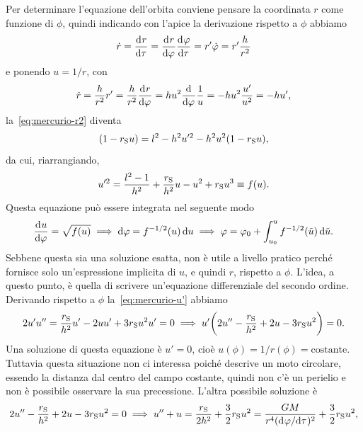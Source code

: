 Per determinare l'equazione dell'orbita conviene pensare la coordinata $r$ come
funzione di $\phi$, quindi indicando con l'apice la derivazione rispetto a
$\phi$ abbiamo
\begin{equation}
  \dot{r} = \frac{{\mathop{}\!\mathrm{d}^{}}r}{\mathop{}\!\mathrm{d} {\tau}^{}} = \frac{{\mathop{}\!\mathrm{d}^{}}r}{\mathop{}\!\mathrm{d} {\varphi}^{}} \frac{{\mathop{}\!\mathrm{d}^{}}\varphi}{\mathop{}\!\mathrm{d} {\tau}^{}} = r' \dot{\varphi}
  = r' \frac{h}{r^{2}}
\end{equation}
e ponendo $u = 1/r$, con
\begin{equation}
  \dot{r} = \frac{h}{r^{2}}r' = \frac{h}{r^{2}}\frac{{\mathop{}\!\mathrm{d}^{}}r}{\mathop{}\!\mathrm{d} {\varphi}^{}} =
  hu^{2}\frac{{\mathop{}\!\mathrm{d}^{}}}{\mathop{}\!\mathrm{d} {\varphi}^{}} \frac{1}{u} = -hu^{2}\frac{u'}{u^{2}} = -hu',
\end{equation}
la~\eqref{eq:mercurio-r2} diventa
\begin{equation}
  (1 - r_{\textup{S}}u) = l^{2} - h^{2}u'^{2} - h^{2}u^{2}(1 - r_{\textup{S}}u),
\end{equation}
da cui, riarrangiando,
\begin{equation}
  \label{eq:mercurio-u'}
  u'^{2} = \frac{l^{2} - 1}{h^{2}} + \frac{r_{\textup{S}}}{h^{2}}u - u^{2} +
  r_{\textup{S}}u^{3} \equiv f(u).
\end{equation}
Questa equazione può essere integrata nel seguente modo
\begin{equation}
  \frac{{\mathop{}\!\mathrm{d}^{}}u}{\mathop{}\!\mathrm{d} {\varphi}^{}} = \sqrt{f(u)} \implies \mathop{}\!\mathrm{d}\varphi = f^{-1/2}(u) \mathop{}\!\mathrm{d} u \implies
  \varphi = \varphi_{0} + \int_{u_{0}}^{u} f^{-1/2}(\tilde{u}) \mathop{}\!\mathrm{d} \tilde{u}.
\end{equation}
Sebbene questa sia una soluzione esatta, non è utile a livello pratico perché
fornisce solo un'espressione implicita di $u$, e quindi $r$, rispetto a $\phi$.
L'idea, a questo punto, è quella di scrivere un'equazione differenziale del
secondo ordine.  Derivando rispetto a $\phi$ la~\eqref{eq:mercurio-u'} abbiamo
\begin{equation}
  \label{eq:mercurio1}
  2u'u'' = \frac{r_{\textup{S}}}{h^{2}}u' - 2uu' + 3r_{\textup{S}}u^{2}u' = 0
  \implies u'\bigg(2u'' - \frac{r_{\textup{S}}}{h^{2}} + 2u -
  3r_{\textup{S}}u^{2}\bigg) = 0.
\end{equation}
Una soluzione di questa equazione è $u' = 0$, cioè
$u(\phi) = 1/r(\phi) = \text{costante}$.  Tuttavia questa situazione non ci
interessa poiché descrive un moto circolare, essendo la distanza dal centro del
campo costante, quindi non c'è un perielio e non è possibile osservare la sua
precessione.  L'altra possibile soluzione è
\begin{equation}
  \label{eq:binet-relativ}
  2u'' - \frac{r_{\textup{S}}}{h^{2}} + 2u - 3r_{\textup{S}}u^{2} = 0 \implies
  u'' + u = \frac{r_{\textup{S}}}{2h^{2}} + \frac{3}{2}r_{\textup{S}}u^{2} =
  \frac{GM}{r^{4}(\mathrm{d}^{}\varphi / \mathrm{d} {\tau}^{})^{2}} + \frac{3}{2}r_{\textup{S}}u^{2},
\end{equation}
